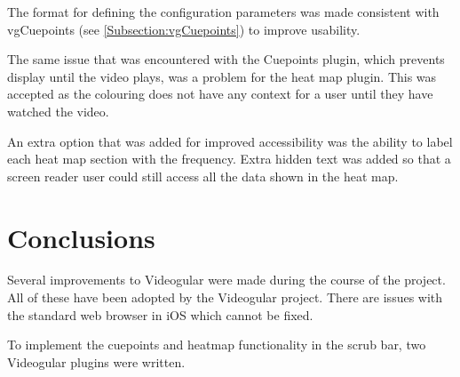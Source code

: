 The format for defining the configuration parameters was made consistent with vgCuepoints (see \autoref{Subsection:vgCuepoints}) to improve usability.

The same issue that was encountered with the Cuepoints plugin, which prevents display until the video plays, was a problem for the heat map plugin. This was accepted as the colouring does not have any context for a user until they have watched the video.

An extra option that was added for improved accessibility was the ability to label each heat map section with the frequency. Extra hidden text was added so that a screen reader user could still access all the data shown in the heat map.

\section{Conclusions}

Several improvements to Videogular were made during the course of the project. All of these have been adopted by the Videogular project. There are issues with the standard web browser in iOS which cannot be fixed.

To implement the cuepoints and heatmap functionality in the scrub bar, two Videogular plugins were written.

